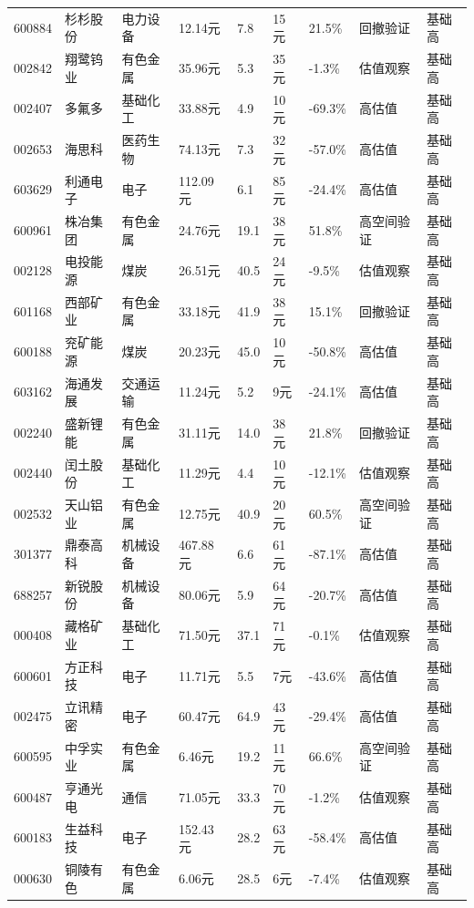 \begin{longtable}{L{1.0cm}L{1.55cm}L{1.4cm}R{1.0cm}R{1.0cm}R{1.0cm}R{1.05cm}L{3.6cm}L{0.9cm}}
600884 & 杉杉股份 & 电力设备 & 12.14元 & 7.8 & 15元 & 21.5\% & 回撤验证 & 基础高 \\
002842 & 翔鹭钨业 & 有色金属 & 35.96元 & 5.3 & 35元 & -1.3\% & 估值观察 & 基础高 \\
002407 & 多氟多 & 基础化工 & 33.88元 & 4.9 & 10元 & -69.3\% & 高估值 & 基础高 \\
002653 & 海思科 & 医药生物 & 74.13元 & 7.3 & 32元 & -57.0\% & 高估值 & 基础高 \\
603629 & 利通电子 & 电子 & 112.09元 & 6.1 & 85元 & -24.4\% & 高估值 & 基础高 \\
600961 & 株冶集团 & 有色金属 & 24.76元 & 19.1 & 38元 & 51.8\% & 高空间验证 & 基础高 \\
002128 & 电投能源 & 煤炭 & 26.51元 & 40.5 & 24元 & -9.5\% & 估值观察 & 基础高 \\
601168 & 西部矿业 & 有色金属 & 33.18元 & 41.9 & 38元 & 15.1\% & 回撤验证 & 基础高 \\
600188 & 兖矿能源 & 煤炭 & 20.23元 & 45.0 & 10元 & -50.8\% & 高估值 & 基础高 \\
603162 & 海通发展 & 交通运输 & 11.24元 & 5.2 & 9元 & -24.1\% & 高估值 & 基础高 \\
002240 & 盛新锂能 & 有色金属 & 31.11元 & 14.0 & 38元 & 21.8\% & 回撤验证 & 基础高 \\
002440 & 闰土股份 & 基础化工 & 11.29元 & 4.4 & 10元 & -12.1\% & 估值观察 & 基础高 \\
002532 & 天山铝业 & 有色金属 & 12.75元 & 40.9 & 20元 & 60.5\% & 高空间验证 & 基础高 \\
301377 & 鼎泰高科 & 机械设备 & 467.88元 & 6.6 & 61元 & -87.1\% & 高估值 & 基础高 \\
688257 & 新锐股份 & 机械设备 & 80.06元 & 5.9 & 64元 & -20.7\% & 高估值 & 基础高 \\
000408 & 藏格矿业 & 基础化工 & 71.50元 & 37.1 & 71元 & -0.1\% & 估值观察 & 基础高 \\
600601 & 方正科技 & 电子 & 11.71元 & 5.5 & 7元 & -43.6\% & 高估值 & 基础高 \\
002475 & 立讯精密 & 电子 & 60.47元 & 64.9 & 43元 & -29.4\% & 高估值 & 基础高 \\
600595 & 中孚实业 & 有色金属 & 6.46元 & 19.2 & 11元 & 66.6\% & 高空间验证 & 基础高 \\
600487 & 亨通光电 & 通信 & 71.05元 & 33.3 & 70元 & -1.2\% & 估值观察 & 基础高 \\
600183 & 生益科技 & 电子 & 152.43元 & 28.2 & 63元 & -58.4\% & 高估值 & 基础高 \\
000630 & 铜陵有色 & 有色金属 & 6.06元 & 28.5 & 6元 & -7.4\% & 估值观察 & 基础高 \\

\end{longtable}
